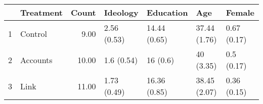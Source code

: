 \begin{table}[ht]
\centering
\begin{tabular}{rlrllll}
  \hline
 & Treatment & Count & Ideology & Education & Age & Female \\ 
  \hline
1 & Control & 9.00 & 2.56 (0.53) & 14.44 (0.65) & 37.44 (1.76) & 0.67 (0.17) \\ 
  2 & Accounts & 10.00 & 1.6 (0.54) & 16 (0.6) & 40 (3.35) & 0.5 (0.17) \\ 
  3 & Link & 11.00 & 1.73 (0.49) & 16.36 (0.85) & 38.45 (2.07) & 0.36 (0.15) \\ 
   \hline
\end{tabular}
\end{table}
